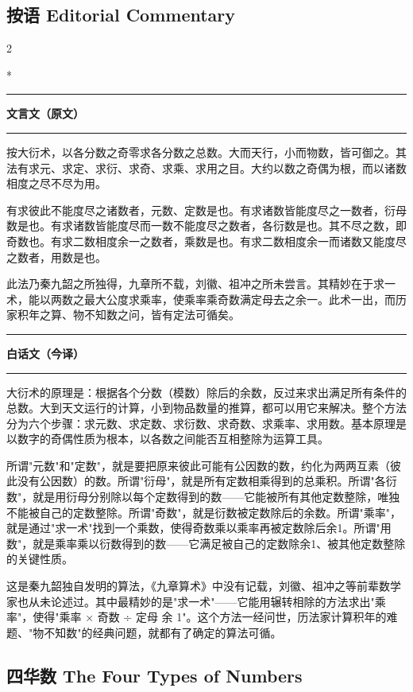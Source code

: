 \documentclass[11pt,a4paper]{article}
\newcommand{\zhtext}[1]{{\chinese #1}}
\newcommand{\leftcolheader}{%
  \noindent\textcolor{leftheader}{\rule{\columnwidth}{1.5pt}}\par
  \vspace{2pt}
  \noindent\textbf{\color{leftheader}\chinese 文言文（原文）}\par
  \vspace{2pt}
  \noindent\textcolor{leftheader}{\rule{\columnwidth}{0.6pt}}\par
  \vspace{4pt}
}
\newcommand{\rightcolheader}{%
  \noindent\textcolor{rightheader}{\rule{\columnwidth}{1.5pt}}\par
  \vspace{2pt}
  \noindent\textbf{\color{rightheader}\chinese 白话文（今译）}\par
  \vspace{2pt}
  \noindent\textcolor{rightheader}{\rule{\columnwidth}{0.6pt}}\par
  \vspace{4pt}
}
\begin{document}
\subsection{\zhtext{按语} Editorial Commentary}

\begin{paracol}{2}

\switchcolumn[0]*\leftcolheader

\small
按大衍术，以各分数之奇零求各分数之总数。大而天行，小而物数，皆可御之。其法有求元、求定、求衍、求奇、求乘、求用之目。大约以数之奇偶为根，而以诸数相度之尽不尽为用。

有求彼此不能度尽之诸数者，元数、定数是也。有求诸数皆能度尽之一数者，衍母数是也。有求诸数皆能度尽而一数不能度尽之数者，各衍数是也。其不尽之数，即奇数也。有求二数相度余一之数者，乘数是也。有求二数相度余一而诸数又能度尽之数者，用数是也。

此法乃秦九韶之所独得，九章所不载，刘徽、祖冲之所未尝言。其精妙在于求一术，能以两数之最大公度求乘率，使乘率乘奇数满定母去之余一。此术一出，而历家积年之算、物不知数之问，皆有定法可循矣。

\switchcolumn\rightcolheader

\small\color{prefacecolor}
大衍术的原理是：根据各个分数（模数）除后的余数，反过来求出满足所有条件的总数。大到天文运行的计算，小到物品数量的推算，都可以用它来解决。整个方法分为六个步骤：求元数、求定数、求衍数、求奇数、求乘率、求用数。基本原理是以数字的奇偶性质为根本，以各数之间能否互相整除为运算工具。

所谓"元数"和"定数"，就是要把原来彼此可能有公因数的数，约化为两两互素（彼此没有公因数）的数。所谓"衍母"，就是所有定数相乘得到的总乘积。所谓"各衍数"，就是用衍母分别除以每个定数得到的数——它能被所有其他定数整除，唯独不能被自己的定数整除。所谓"奇数"，就是衍数被定数除后的余数。所谓"乘率"，就是通过"求一术"找到一个乘数，使得奇数乘以乘率再被定数除后余1。所谓"用数"，就是乘率乘以衍数得到的数——它满足被自己的定数除余1、被其他定数整除的关键性质。

这是秦九韶独自发明的算法，《九章算术》中没有记载，刘徽、祖冲之等前辈数学家也从未论述过。其中最精妙的是"求一术"——它能用辗转相除的方法求出"乘率"，使得"乘率 × 奇数 ÷ 定母 余 1"。这个方法一经问世，历法家计算积年的难题、"物不知数"的经典问题，就都有了确定的算法可循。

\end{paracol}

\subsection{\zhtext{四华数} The Four Types of Numbers}
\end{document}
